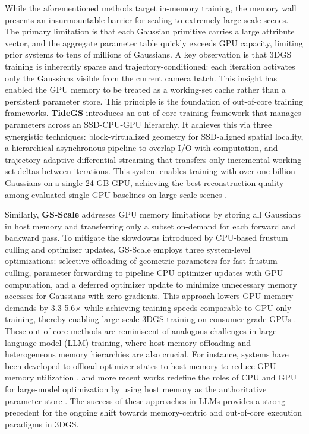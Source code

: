 \documentclass[11pt]{article}
\begin{document}
While the aforementioned methods target in-memory training, the memory wall presents an insurmountable barrier for scaling to extremely large-scale scenes. The primary limitation is that each Gaussian primitive carries a large attribute vector, and the aggregate parameter table quickly exceeds GPU capacity, limiting prior systems to tens of millions of Gaussians. A key observation is that 3DGS training is inherently sparse and trajectory-conditioned: each iteration activates only the Gaussians visible from the current camera batch. This insight has enabled the GPU memory to be treated as a working-set cache rather than a persistent parameter store. This principle is the foundation of out-of-core training frameworks. \textbf{TideGS} introduces an out-of-core training framework that manages parameters across an SSD-CPU-GPU hierarchy. It achieves this via three synergistic techniques: block-virtualized geometry for SSD-aligned spatial locality, a hierarchical asynchronous pipeline to overlap I/O with computation, and trajectory-adaptive differential streaming that transfers only incremental working-set deltas between iterations. This system enables training with over one billion Gaussians on a single 24 GB GPU, achieving the best reconstruction quality among evaluated single-GPU baselines on large-scale scenes \cite{ref467}.

Similarly, \textbf{GS-Scale} addresses GPU memory limitations by storing all Gaussians in host memory and transferring only a subset on-demand for each forward and backward pass. To mitigate the slowdowns introduced by CPU-based frustum culling and optimizer updates, GS-Scale employs three system-level optimizations: selective offloading of geometric parameters for fast frustum culling, parameter forwarding to pipeline CPU optimizer updates with GPU computation, and a deferred optimizer update to minimize unnecessary memory accesses for Gaussians with zero gradients. This approach lowers GPU memory demands by 3.3-5.6× while achieving training speeds comparable to GPU-only training, thereby enabling large-scale 3DGS training on consumer-grade GPUs \cite{ref468}. These out-of-core methods are reminiscent of analogous challenges in large language model (LLM) training, where host memory offloading and heterogeneous memory hierarchies are also crucial. For instance, systems have been developed to offload optimizer states to host memory to reduce GPU memory utilization \cite{ref469}, and more recent works redefine the roles of CPU and GPU for large-model optimization by using host memory as the authoritative parameter store \cite{ref470}. The success of these approaches in LLMs provides a strong precedent for the ongoing shift towards memory-centric and out-of-core execution paradigms in 3DGS.
\end{document}
